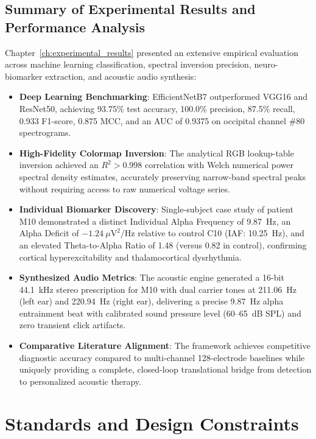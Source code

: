 \documentclass[12pt, a4paper]{report}
\begin{document}
\section{Summary of Experimental Results and Performance Analysis}
\label{sec:results_summary}
Chapter~\ref{ch:experimental_results} presented an extensive empirical evaluation across machine learning classification, spectral inversion precision, neuro-biomarker extraction, and acoustic audio synthesis:
\begin{itemize}
    \item \textbf{Deep Learning Benchmarking}: EfficientNetB7 outperformed VGG16 and ResNet50, achieving 93.75\% test accuracy, 100.0\% precision, 87.5\% recall, 0.933 F1-score, 0.875 MCC, and an AUC of 0.9375 on occipital channel \#80 spectrograms.
    \item \textbf{High-Fidelity Colormap Inversion}: The analytical RGB lookup-table inversion achieved an $R^2 > 0.998$ correlation with Welch numerical power spectral density estimates, accurately preserving narrow-band spectral peaks without requiring access to raw numerical voltage series.
    \item \textbf{Individual Biomarker Discovery}: Single-subject case study of patient M10 demonstrated a distinct Individual Alpha Frequency of 9.87~Hz, an Alpha Deficit of $-1.24~\mu\text{V}^2/\text{Hz}$ relative to control C10 (IAF: 10.25~Hz), and an elevated Theta-to-Alpha Ratio of 1.48 (versus 0.82 in control), confirming cortical hyperexcitability and thalamocortical dysrhythmia.
    \item \textbf{Synthesized Audio Metrics}: The acoustic engine generated a 16-bit 44.1~kHz stereo prescription for M10 with dual carrier tones at 211.06~Hz (left ear) and 220.94~Hz (right ear), delivering a precise 9.87~Hz alpha entrainment beat with calibrated sound pressure level (60--65~dB SPL) and zero transient click artifacts.
    \item \textbf{Comparative Literature Alignment}: The framework achieves competitive diagnostic accuracy compared to multi-channel 128-electrode baselines while uniquely providing a complete, closed-loop translational bridge from detection to personalized acoustic therapy.
\end{itemize}

\chapter{Standards and Design Constraints}
\label{ch:design_constraints}
\end{document}

